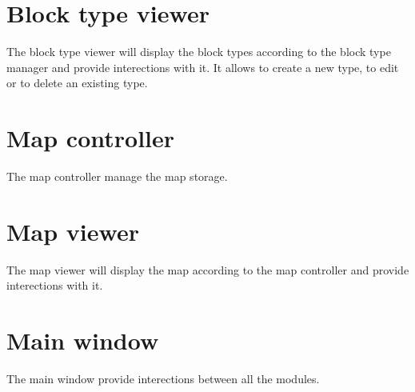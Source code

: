 \section{Block type viewer}
The block type viewer will display the block types according to the block type manager and provide interections with it. It allows to create a new type, to edit or to delete an existing type.
\section{Map controller}
The map controller manage the map storage.
\section{Map viewer}
The map viewer will display the map according to the map controller and provide interections with it.
\section{Main window}
The main window provide interections between all the modules.